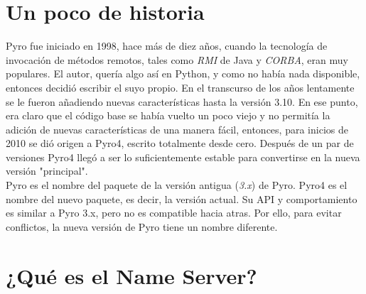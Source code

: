 \documentclass{article}
\begin{document}
\section{Un poco de historia}
Pyro fue iniciado en 1998, hace más de diez años, cuando la tecnología de invocación de métodos remotos, tales como \textit{RMI} de Java y \textit{CORBA}, eran muy populares. El autor, quería algo así en Python, y como no había nada disponible, entonces decidió escribir el suyo propio. En el transcurso de los años lentamente se le fueron añadiendo nuevas características hasta la versión 3.10. En ese punto, era claro que el código base se había vuelto un poco viejo y no permitía la adición de nuevas características de una manera fácil, entonces, para inicios de 2010 se dió origen a Pyro4, escrito totalmente desde cero. Después de un par de versiones Pyro4 llegó a ser lo suficientemente estable para convertirse en la nueva versión "principal".\\

Pyro es el nombre del paquete de la versión antigua (\textit{3.x}) de Pyro. Pyro4 es el nombre del nuevo paquete, es decir, la versión actual. Su API y comportamiento es similar a Pyro 3.x, pero no es compatible hacia atras. Por ello, para evitar conflictos, la nueva versión de Pyro tiene un nombre diferente.

\section{¿Qué es el Name Server?}
\end{document}

